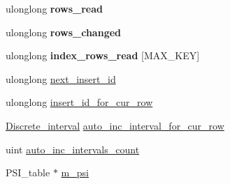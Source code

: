 \begin{DoxyCompactItemize}
\mbox{\label{classhandler_ae02710c45cf96dacef1109b49de048ee}} 
ulonglong {\bfseries rows\+\_\+read}
\item 
\mbox{\label{classhandler_a77d78935307f2f6fc1d918ddc30ef8d7}} 
ulonglong {\bfseries rows\+\_\+changed}
\item 
\mbox{\label{classhandler_a73622d661f0eb2a305f8bff3a9b99c18}} 
ulonglong {\bfseries index\+\_\+rows\+\_\+read} \mbox{[}M\+A\+X\+\_\+\+K\+EY\mbox{]}
\item 
ulonglong \mbox{\hyperlink{classhandler_a62ab295e407d8a5c50087fed0f4fcd18}{next\+\_\+insert\+\_\+id}}
\item 
ulonglong \mbox{\hyperlink{classhandler_a05dd2cafd83ae60562649bf9688aebf1}{insert\+\_\+id\+\_\+for\+\_\+cur\+\_\+row}}
\item 
\mbox{\hyperlink{classDiscrete__interval}{Discrete\+\_\+interval}} \mbox{\hyperlink{classhandler_a1540a47a05c03724f1102aaaa623131e}{auto\+\_\+inc\+\_\+interval\+\_\+for\+\_\+cur\+\_\+row}}
\item 
uint \mbox{\hyperlink{classhandler_acdfcef0738a89138c8f41ded8da17c0a}{auto\+\_\+inc\+\_\+intervals\+\_\+count}}
\item 
P\+S\+I\+\_\+table $\ast$ \mbox{\hyperlink{classhandler_a881e7cba3fe3bf9731a91be82983cc35}{m\+\_\+psi}}
\end{DoxyCompactItemize}
